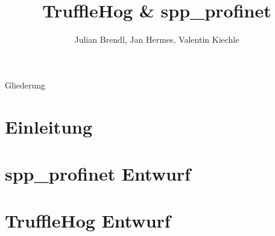 \documentclass[18pt]{beamer}
\title[TruffleHog \& spp\_profinet]{TruffleHog \& spp\_profinet}
\author{Julian Brendl, Jan Hermes, Valentin Kiechle}
\institute{Fraunhofer IOSB}
\begin{document}

\begin{frame}
	\titlepage
\end{frame}

\begin{frame}{Gliederung}
	\tableofcontents
\end{frame}

\section{Einleitung}
	

\section{spp_profinet Entwurf}
	

\section{TruffleHog Entwurf}
	
	\subsection{}
	



\appendix
\beginbackup
\backupend
\end{document}
